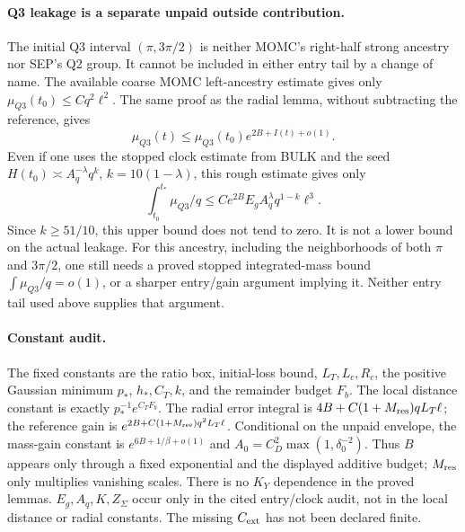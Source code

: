 \documentclass[11pt]{article}
\theoremstyle{remark}\newtheorem{remark}[proposition]{Remark}
\begin{document}
\paragraph{Q3 leakage is a separate unpaid outside contribution.}
The initial Q3 interval $(\pi,3\pi/2)$ is neither MOMC's
right-half strong ancestry nor SEP's Q2 group. It cannot be
included in either entry tail by a change of name. The available
coarse MOMC left-ancestry estimate gives only
$\mu_{Q3}(t_0)\le Cq^2\ell^2$. The same proof as the radial
lemma, without subtracting the reference, gives
\[
 \mu_{Q3}(t)\le\mu_{Q3}(t_0)e^{2B+I(t)+o(1)}.
\]
Even if one uses the stopped clock estimate from BULK and the
seed $H(t_0)\asymp A_q^{-\lambda}q^k$, $k=10(1-\lambda)$,
this rough estimate gives only
\[
 \int_{t_0}^{t_*}\mu_{Q3}/q
 \le C e^{2B}E_g A_q^{\lambda}q^{1-k}\ell^3.
\]
Since $k\ge51/10$, this upper bound does not tend to zero.
It is not a lower bound on the actual leakage. For this ancestry,
including the neighborhoods of both $\pi$ and $3\pi/2$, one
still needs a proved stopped integrated-mass bound
$\int\mu_{Q3}/q=o(1)$, or a sharper entry/gain argument implying
it. Neither entry tail used above supplies that argument.

\paragraph{Constant audit.}
The fixed constants are the ratio box, initial-loss bound,
$L_T,L_c,R_c$, the positive Gaussian minimum $p_*$,
$h_*,C_T,k$, and the remainder budget $F_b$.
The local distance constant is exactly
$p_*^{-1}e^{C_TF_b}$. The radial error integral is
$4B+C(1+M_{\rm res})qL_T\ell$; the reference gain is
$e^{2B+C(1+M_{\rm res})q^2L_T\ell}$.
Conditional on the unpaid envelope, the mass-gain constant is
$e^{6B+1/\beta+o(1)}$ and
$A_0=C_D^2\max(1,\delta_0^{-2})$.
Thus $B$ appears only through a fixed exponential and the
displayed additive budget; $M_{\rm res}$ only multiplies
vanishing scales. There is no $K_Y$ dependence in the proved
lemmas. $E_g,A_q,K,Z_\Sigma$ occur only in the cited entry/clock
audit, not in the local distance or radial constants.
The missing $C_{\rm ext}$ has not been declared finite.
\end{document}
